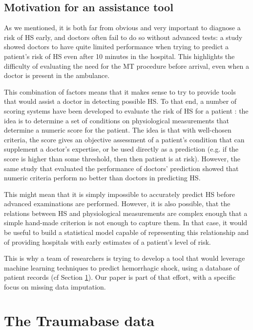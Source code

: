 		\subsection{Motivation for an assistance tool}

As we mentioned, it is both far from obvious and very important to diagnose a risk of HS early, and doctors often fail to do so without advanced tests: a study \cite{AUC_doctors} showed doctors to have quite limited performance when trying to predict a patient's risk of HS even after 10 minutes in the hospital. This highlights the difficulty of evaluating the need for the MT procedure before arrival, even when a doctor is present in the ambulance.

This combination of factors means that it makes sense to try to provide tools that would assist a doctor in detecting possible HS. To that end, a number of scoring systems have been developed to evaluate the risk of HS for a patient \cite{Score1} \cite{Score2} \cite{...}: the idea is to determine a set of conditions on physiological measurements that determine a numeric score for the patient. The idea is that with well-chosen criteria, the score gives an objective assessment of a patient's condition that can supplement a doctor's expertise, or be used directly as a prediction (e.g. if the score is higher than some threshold, then then patient is at risk). However, the same study that evaluated the performance of doctors' prediction \cite{AUC_doctors} showed that numeric criteria perform no better than doctors in predicting HS.

This might mean that it is simply impossible to accurately predict HS before advanced examinations are performed. However, it is also possible, that the relations between HS and physiological measurements are complex enough that a simple hand-made criterion is not enough to capture them. In that case, it would be useful to build a statistical model capable of representing this relationship and of providing hospitals with early estimates of a patient's level of risk. 

This is why a team of researchers is trying to develop a tool that would leverage machine learning techniques to predict hemorrhagic shock, using a database of patient records (cf Section \ref{traumabase}). Our paper is part of that effort, with a specific focus on missing data imputation.

	\section{The Traumabase data}
	\label{traumabase}
